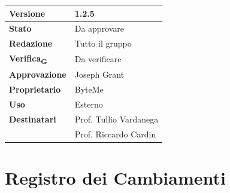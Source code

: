 \documentclass[11pt,a4paper]{article}
\newcommand{\gls}[1]{#1\textsubscript{G}}
\begin{document}
\begin{titlepage}
    \begin{table}[H]
        \centering
        \begin{tabular}{|l|p{5cm}|}
            \hline
            \textbf{Versione} & 1.2.5 \\
            \hline
            \textbf{Stato} & Da approvare \\
            \hline
            \textbf{Redazione} & Tutto il gruppo \\
            \hline
            \textbf{\gls{Verifica}} & Da verificare \\
            \hline
            \textbf{Approvazione} & Joseph Grant \\
            \hline
            \textbf{Proprietario} & ByteMe \\
            \hline
            \textbf{Uso} & Esterno \\
            \hline
            \textbf{Destinatari} & Prof. Tullio Vardanega \\ & Prof. Riccardo Cardin \\
            \hline
        \end{tabular}
    \end{table}
    
    \vfill
\end{titlepage}

\thispagestyle{empty}
\section*{Registro dei Cambiamenti}
\end{document}
